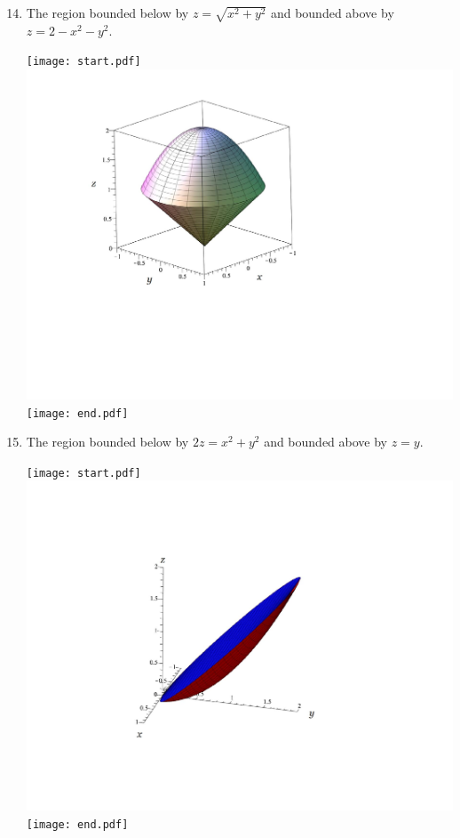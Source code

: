 \documentclass[12pt]{article}
\begin{document}
\begin{enumerate}
\setcounter{enumi}{13}

\item The region bounded below by $z=\sqrt{x^2+y^2}$ and bounded above by $z=2-x^2-y^2$.

\texttt{[image: start.pdf]}
{{\includegraphics[scale=0.4]{top.pdf}}}
\texttt{[image: end.pdf]}


\item The region bounded below by $2z=x^2+y^2$ and bounded above by $z=y$.

\texttt{[image: start.pdf]}
{{\includegraphics[scale=0.4]{slice.pdf}}}
\texttt{[image: end.pdf]}



\end{enumerate}
\end{document}
